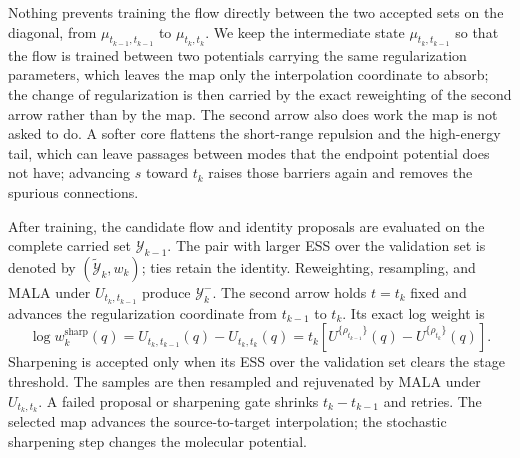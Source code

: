 \documentclass{article}
\begin{document}
Nothing prevents training the flow directly between the two accepted sets on the diagonal, from $\mu_{t_{k-1},t_{k-1}}$ to $\mu_{t_k,t_k}$. We keep the intermediate state $\mu_{t_k,t_{k-1}}$ so that the flow is trained between two potentials carrying the same regularization parameters, which leaves the map only the interpolation coordinate to absorb; the change of regularization is then carried by the exact reweighting of the second arrow rather than by the map. The second arrow also does work the map is not asked to do. A softer core flattens the short-range repulsion and the high-energy tail, which can leave passages between modes that the endpoint potential does not have; advancing $s$ toward $t_k$ raises those barriers again and removes the spurious connections.

After training, the candidate flow and identity proposals are evaluated on the complete carried set $\mathcal Y_{k-1}$. The pair with larger ESS over the validation set is denoted by $(\tilde{\mathcal Y}_k,w_k)$; ties retain the identity. Reweighting, resampling, and MALA under $U_{t_k,t_{k-1}}$ produce $\mathcal Y_k^-$. The second arrow holds $t=t_k$ fixed and advances the regularization coordinate from $t_{k-1}$ to $t_k$. Its exact log weight is
\begin{equation}
\log w_k^{\mathrm{sharp}}(q)
=U_{t_k,t_{k-1}}(q)-U_{t_k,t_k}(q)
=t_k\!\left[U^{\{\rho_{t_{k-1}}\}}(q)
-U^{\{\rho_{t_k}\}}(q)\right].
\label{eq: molecular-sharpening-weight}
\end{equation}
Sharpening is accepted only when its ESS over the validation set clears the stage threshold. The samples are then resampled and rejuvenated by MALA under $U_{t_k,t_k}$. A failed proposal or sharpening gate shrinks $t_k-t_{k-1}$ and retries. The selected map advances the source-to-target interpolation; the stochastic sharpening step changes the molecular potential.
\end{document}
